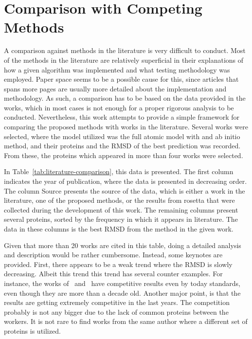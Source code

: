 \section{Comparison with Competing Methods}
\label{sec:competing-methods}

A comparison against methods in the literature is very difficult to conduct.
Most of the methods in the literature are relatively superficial in their
explanations of how a given algorithm was implemented and what testing
methodology was employed. Paper space seems to be a possible cause for this,
since articles that spans more pages are usually more detailed about the
implementation and methodology. As such, a comparison has to be based on the
data provided in the works, which in most cases is not enough for a proper
rigorous analysis to be conducted. Nevertheless, this work attempts to provide
a simple framework for comparing the proposed methods with works in the
literature. Several works were selected, where the model utilized was the
full atomic model with and ab initio method, and their proteins and the RMSD
of the best prediction was recorded. From these, the proteins which appeared in
more than four works were selected.



In Table~\ref{tab:literature-comparison}, this data is presented. The first
column indicates the year of publication, where the data is presented in
decreasing order. The column Source presents the source of the data, which is
either a work in the literature, one of the proposed methods, or the results
from rosetta that were collected during the development of this work. The
remaining columns present several proteins, sorted by the frequency in which it
appears in literature. The data in these columns is the best RMSD from the
method in the given work.

Given that more than 20 works are cited in this table, doing a detailed
analysis and description would be rather cumbersome. Instead, some keynotes are
provided. First, there appears to be a weak trend where the RMSD is slowly
decreasing. Albeit this trend this trend has several counter examples.
For instance, the works of~\cite{cazacu2014steel} and~\cite{judy2009multi}
have competitive results even by today standards, even though they are more than
a decade old. Another major point, is that the results are getting extremely
competitive in the last years. The competition probably is not any bigger due to
the lack of common proteins between the workers. It is not rare to find works
from the same author where a different set of proteins is utilized.

